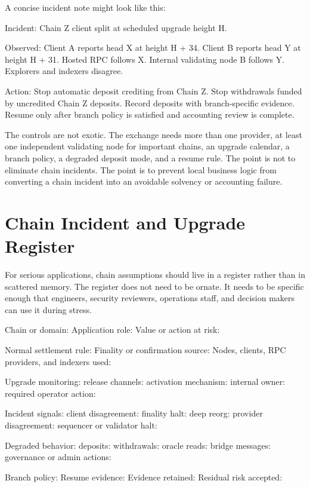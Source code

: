 A concise incident note might look like this:

\begin{codeblock}
Incident: Chain Z client split at scheduled upgrade height H.

Observed:
    Client A reports head X at height H + 34.
    Client B reports head Y at height H + 31.
    Hosted RPC follows X.
    Internal validating node B follows Y.
    Explorers and indexers disagree.

Action:
    Stop automatic deposit crediting from Chain Z.
    Stop withdrawals funded by uncredited Chain Z deposits.
    Record deposits with branch-specific evidence.
    Resume only after branch policy is satisfied and accounting review is complete.
\end{codeblock}

The controls are not exotic. The exchange needs more than one provider, at least one independent validating node for important chains, an upgrade calendar, a branch policy, a degraded deposit mode, and a resume rule. The point is not to eliminate chain incidents. The point is to prevent local business logic from converting a chain incident into an avoidable solvency or accounting failure.

\section{Chain Incident and Upgrade Register}

For serious applications, chain assumptions should live in a register rather than in scattered memory. The register does not need to be ornate. It needs to be specific enough that engineers, security reviewers, operations staff, and decision makers can use it during stress.

\begin{artifactbox}
\begin{codeblock}
Chain or domain:
Application role:
Value or action at risk:

Normal settlement rule:
Finality or confirmation source:
Nodes, clients, RPC providers, and indexers used:

Upgrade monitoring:
    release channels:
    activation mechanism:
    internal owner:
    required operator action:

Incident signals:
    client disagreement:
    finality halt:
    deep reorg:
    provider disagreement:
    sequencer or validator halt:

Degraded behavior:
    deposits:
    withdrawals:
    oracle reads:
    bridge messages:
    governance or admin actions:

Branch policy:
Resume evidence:
Evidence retained:
Residual risk accepted:
\end{codeblock}
\end{artifactbox}


